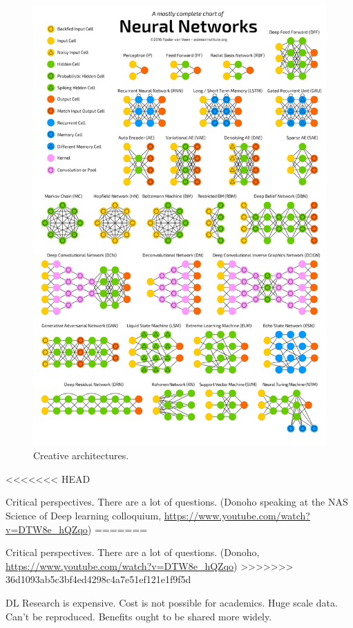 \documentclass[english]{article}
\begin{document}
 
\begin{figure}
  \centering
  \includegraphics[scale=0.35]{Chart.png}
  \caption{Creative architectures.}
  \label{arch}
\end{figure}

<<<<<<< HEAD
\item Critical perspectives. There are a lot of questions. (Donoho speaking at the NAS Science of Deep learning colloquium, \url{https://www.youtube.com/watch?v=DTW8e_hQZqo})
=======
\item Critical perspectives. There are a lot of questions. (Donoho, \url{https://www.youtube.com/watch?v=DTW8e_hQZqo})
>>>>>>> 36d1093ab5c3bf4ed4298c4a7e51ef121e1f9f5d

DL Research is expensive. Cost is not possible for academics. Huge scale data. Can't be reproduced. Benefits ought to be shared more widely. 
\end{document}
